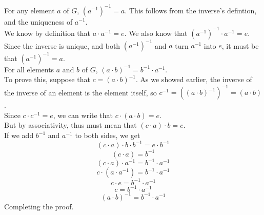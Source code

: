 \documentclass[12pt]{article}
\begin{document}
    For any element $a$ of $G$, $(a^{-1})^{-1} = a$.
    This follows from the inverse's defintion,
    and the uniqueness of $a^{-1}$. \\
    We know by definition that $a \cdot a^{-1} = e$.
    We also know that $(a^{-1})^{-1} \cdot a^{-1} = e$.
    Since the inverse is unique,
    and both $(a^{-1})^{-1}$ and $a$ turn $a^{-1}$ into $e$,
    it must be that $(a^{-1})^{-1} = a$. \\

    For all elements $a$ and $b$ of $G$,
    $(a \cdot b)^{-1} = b^{-1} \cdot a^{-1}$. \\ 
    To prove this,
    suppose that $c = (a \cdot b)^{-1}$.
    As we showed earlier, the inverse of the inverse of an element
    is the element itself,
    so $c^{-1} = ((a \cdot b)^{-1})^{-1} = (a \cdot b)$. \\
    Since $c \cdot c^{-1} = e$,
    we can write that $c \cdot (a \cdot b) = e$. \\
    But by associativity,
    thus must mean that $(c \cdot a) \cdot b = e$. \\
    If we add $b^{-1}$ and $a^{-1}$ to both sides, we get
    \[(c \cdot a) \cdot b \cdot b^{-1} = e \cdot b^{-1}\]
    \[(c \cdot a) = b^{-1}\]
    \[(c \cdot a) \cdot a^{-1} = b^{-1} \cdot a^{-1} \]
    \[c \cdot (a \cdot a^{-1}) = b^{-1} \cdot a^{-1} \]
    \[c \cdot e = b^{-1} \cdot a^{-1} \]
    \[c = b^{-1} \cdot a^{-1} \]
    \[(a \cdot b)^{-1} = b^{-1} \cdot a^{-1} \]
    Completing the proof. \\
\end{document}
